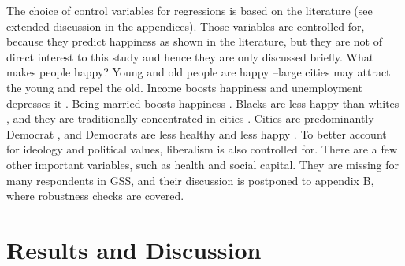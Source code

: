\documentclass[12pt, letterpaper]{article}
\begin{document}
\begin{spacing}{1.9}
 The choice of control variables for regressions is based on the literature
 (see extended discussion in the  appendices). %
Those variables are controlled for,  because they predict happiness as
  shown in the literature, but they are not of direct interest to this study and
  hence they are only  discussed briefly. 
% 
What makes people happy? Young and old people are happy
 \citep[e.g.,][]{teksoz}--large cities may attract the young and
repel the old. Income boosts happiness and
unemployment depresses it
\citep[e.g.,][]{ditella01moa,ditella01mob,ditella06m}. Being married
 boosts happiness \citep[e.g.,][]{myers00,diener04s}.
 Blacks are less happy than whites 
\citep[e.g.,][]{aokcities,aok11a}, and they are traditionally
concentrated in cities \citep{jargowsky97}.   Cities are
predominantly Democrat \citep{hansonCityJournalautumn15}, and 
 Democrats are less healthy \citep{subramanian09a} and less happy
\citep{jost09al,napier08,jost03al}. %
  To better account for ideology and political values,   liberalism is also
 controlled for. 
 There are a few other important variables, such as health  and social
 capital. They are missing for many respondents in GSS,  and their
 discussion is postponed to appendix B, where robustness checks are
 covered.  

\section*{Results and Discussion}


\end{spacing}
\end{document}
